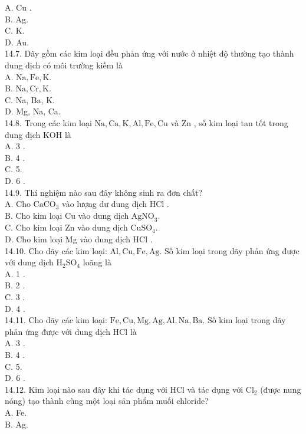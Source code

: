\documentclass[10pt]{article}
\begin{document}
A. Cu .\\
B. Ag.\\
C. K.\\
D. Au.\\
14.7. Dãy gồm các kim loại đều phản ứng với nước ở nhiệt độ thường tạo thành dung dịch có môi trường kiềm là\\
A. $\mathrm{Na}, \mathrm{Fe}, \mathrm{K}$.\\
B. $\mathrm{Na}, \mathrm{Cr}, \mathrm{K}$.\\
C. Na, Ba, K.\\
D. Mg, Na, Ca.\\
14.8. Trong các kim loại $\mathrm{Na}, \mathrm{Ca}, \mathrm{K}, \mathrm{Al}, \mathrm{Fe}, \mathrm{Cu}$ và Zn , số kim loại tan tốt trong dung dịch KOH là\\
A. 3 .\\
B. 4 .\\
C. 5.\\
D. 6 .\\
14.9. Thí nghiệm nào sau đây không sinh ra đơn chất?\\
A. Cho $\mathrm{CaCO}_{3}$ vào lượng dư dung dịch HCl .\\
B. Cho kim loại Cu vào dung dịch $\mathrm{AgNO}_{3}$.\\
C. Cho kim loại Zn vào dung dịch $\mathrm{CuSO}_{4}$.\\
D. Cho kim loại Mg vào dung dịch HCl .\\
14.10. Cho dãy các kim loại: $\mathrm{Al}, \mathrm{Cu}, \mathrm{Fe}, \mathrm{Ag}$. Số kim loại trong dãy phản ứng được với dung dịch $\mathrm{H}_{2} \mathrm{SO}_{4}$ loãng là\\
A. 1 .\\
B. 2 .\\
C. 3 .\\
D. 4 .\\
14.11. Cho dãy các kim loại: $\mathrm{Fe}, \mathrm{Cu}, \mathrm{Mg}, \mathrm{Ag}, \mathrm{Al}, \mathrm{Na}, \mathrm{Ba}$. Số kim loại trong dãy phản ứng được với dung dịch HCl là\\
A. 3 .\\
B. 4 .\\
C. 5.\\
D. 6 .\\
14.12. Kim loại nào sau đây khi tác dụng với HCl và tác dụng với $\mathrm{Cl}_{2}$ (được nung nóng) tạo thành cùng một loại sản phẩm muối chloride?\\
A. Fe.\\
B. Ag.\\
\end{document}
